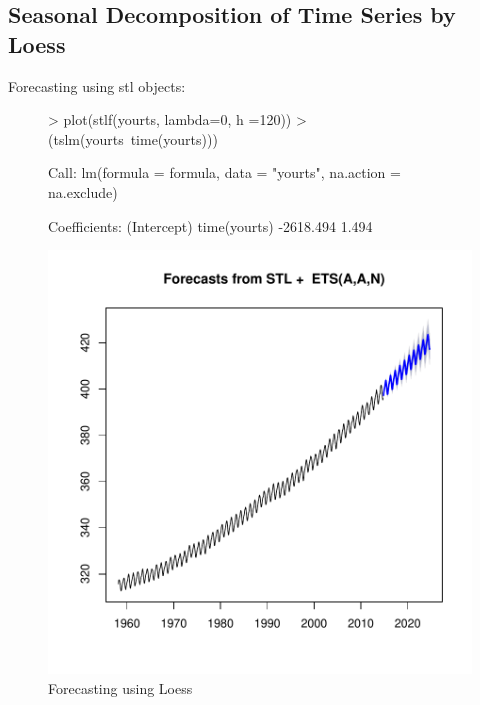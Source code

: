 \documentclass[11pt, a4paper]{article} %
\begin{document}
\subsection{Seasonal Decomposition of Time Series by Loess}
Forecasting using stl objects:
\begin{figure}[H]
\centering
\begin{Schunk}
\begin{Sinput}
> plot(stlf(yourts, lambda=0, h =120))
> (tslm(yourts~time(yourts)))
\end{Sinput}
\begin{Soutput}
Call:
lm(formula = formula, data = "yourts", na.action = na.exclude)

Coefficients:
 (Intercept)  time(yourts)  
   -2618.494         1.494  
\end{Soutput}
\end{Schunk}
\includegraphics{alles-032}
\caption{Forecasting using Loess}
\end{figure}
\end{document}
